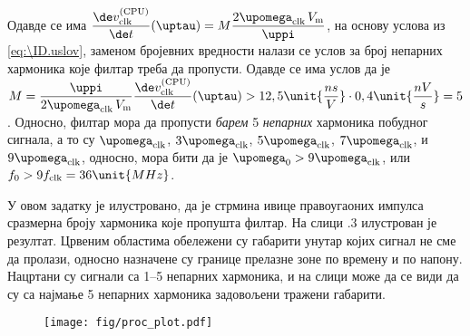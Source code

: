     
    Одавде се има 
    $\dfrac{\de v_{\rm clk}^{\rm (CPU)}}{\de t} (\uptau)
    = 
    M
    \dfrac{ 2
        \upomega_{\rm clk} \, 
        V_{\rm m} }{\uppi} 
    $, на основу услова из \eqref{eq:\ID.uslov}, заменом бројевних вредности налази се услов 
    за број непарних хармоника које филтар треба да пропусти. Одавде се има услов да је 
    $M = 
    \dfrac{\uppi} { 2
        \upomega_{\rm clk} \, 
        V_{\rm m} } 
    \dfrac{\de v_{\rm clk}^{\rm (CPU)}}{\de t} (\uptau)
    > 12,5 \unit{\dfrac{ns}{V}} \cdot 0,4 \unit{\dfrac{nV}{s}} = 5$. Односно, филтар мора да пропусти
    \textit{барем} 5 \textit{непарних} хармоника побудног сигнала, а то су
    $\upomega_{\rm clk}$, $3\upomega_{\rm clk}$, $5\upomega_{\rm clk}$, $7\upomega_{\rm clk}$, и
    $9\upomega_{\rm clk}$, односно, мора бити да је 
    $\upomega_0 > 9\upomega_{\rm clk}$, или 
    $f_0 > 9f_{\rm clk} = 36\unit{MHz}$.    
 
    У овом задатку је илустровано, да је стрмина ивице правоугаоних импулса сразмерна
    броју хармоника које пропушта филтар. На слици \ID.3 илустрован је резултат. 
    Црвеним областима обележени су габарити унутар којих сигнал не сме да пролази, 
    односно назначене су границе прелазне зоне по времену и по напону. Нацртани су сигнали 
    са 1--5 непарних хармоника, и на слици може да се види да су са најмање 5
    непарних хармоника задовољени
    тражени габарити. 

    \begin{figure}[ht!]
        \centering
        \texttt{[image: fig/proc\_plot.pdf]} 
        \caption{}
    \end{figure}